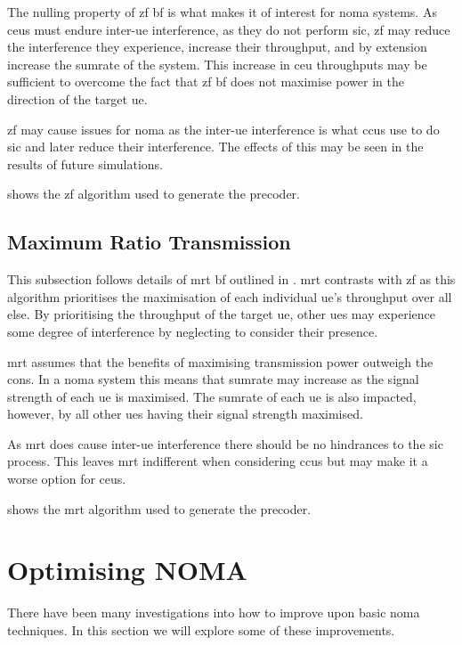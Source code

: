 \par
The nulling property of \ac{zf} \ac{bf} is what makes it of interest for \ac{noma} systems.
As \acp{ceu} must endure inter-\ac{ue} interference, as they do not perform \ac{sic}, \ac{zf} may reduce the interference they experience, increase their throughput, and by extension increase the sumrate of the system.
This increase in \ac{ceu} throughputs may be sufficient to overcome the fact that \ac{zf} \ac{bf} does not maximise power in the direction of the target \ac{ue}.

\par
\ac{zf} may cause issues for \ac{noma} as the inter-\ac{ue} interference is what \acp{ccu} use to do \ac{sic} and later reduce their interference.
The effects of this may be seen in the results of future simulations.

\par
{} shows the \ac{zf} algorithm used to generate the precoder.

\subsection{Maximum Ratio Transmission}
This subsection follows details of \ac{mrt} \ac{bf} outlined in \cite{mrt,mrt2}.
\ac{mrt} contrasts with \ac{zf} as this algorithm prioritises the maximisation of each individual \ac{ue}'s throughput over all else.
By prioritising the throughput of the target \ac{ue}, other \acp{ue} may experience some degree of interference by neglecting to consider their presence.

\par
\ac{mrt} assumes that the benefits of maximising transmission power outweigh the cons.
In a \ac{noma} system this means that sumrate may increase as the signal strength of each \ac{ue} is maximised.
The sumrate of each \ac{ue} is also impacted, however, by all other \acp{ue} having their signal strength maximised.

\par
As \ac{mrt} does cause inter-\ac{ue} interference there should be no hindrances to the \ac{sic} process.
This leaves \ac{mrt} indifferent when considering \acp{ccu} but may make it a worse option for \acp{ceu}.

\par
{} shows the \ac{mrt} algorithm used to generate the precoder.

\section{Optimising NOMA}
There have been many investigations into how to improve upon basic \ac{noma} techniques.
In this section we will explore some of these improvements.

